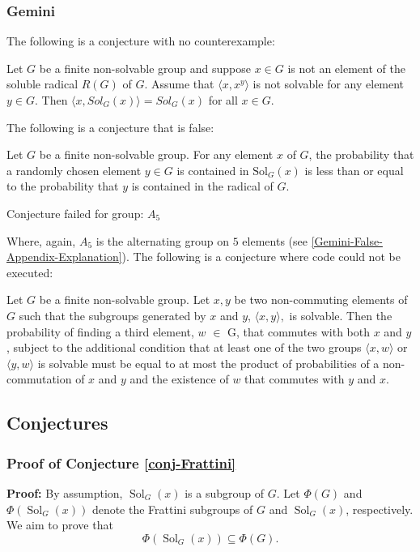\documentclass{article}
\begin{document}
\subsubsection{Gemini}
 The following is a conjecture with no counterexample:
\begin{conj}\label{Gemini-no-counter}
    Let $G$ be a finite non-solvable group and suppose $x \in G$ is not an element of the soluble radical  $R(G)$ of $G$.   Assume that $\langle x , x^y \rangle$  is not solvable for any element $ y \in G.$ Then $\langle x, Sol_G(x)\rangle=Sol_G(x)$ for all $x \in G$.
\end{conj}
The following is a conjecture that is false:
\begin{conj}\label{Gemini-False-Appendix}
    Let $G$ be a finite non-solvable group. For any element $x$ of $G$, the probability that a randomly chosen element $y \in G$ is contained in $\text{Sol}_G(x)$ is less than or equal to the  probability that $y$ is contained in the radical of $G$.
\end{conj}
\begin{codeout}
    Conjecture failed for group: $A_5$
\end{codeout}
Where, again, $A_5$ is the alternating group on $5$ elements (see \ref{Gemini-False-Appendix-Explanation}). 
The following is a conjecture where code could not be executed:
\begin{conj}
    Let $G$ be a finite non-solvable group.  Let $x, y$ be two non-commuting elements of $G$ such that the subgroups generated by $x$ and $y$, $\langle x,y \rangle,$ is solvable. Then the probability of  finding a third element, $w$ $\in$ G, that commutes with both $x$ and $y$, subject to the additional condition that at least one of the two groups  $\langle x , w\rangle$ or $\langle y ,w \rangle$ is solvable must be equal to at most the product of probabilities of a non-commutation of $x$ and $y$ and the existence of $w$ that commutes with $y$ and $x$.
\end{conj}
\subsection{Conjectures}

\subsubsection{Proof of Conjecture \ref{conj-Frattini}}\label{proof-Frattini}
\textbf{Proof:}
By assumption, \( \operatorname{Sol}_G(x) \) is a subgroup of \( G \). Let \( \Phi(G) \) and \( \Phi(\operatorname{Sol}_G(x)) \) denote the Frattini subgroups of \( G \) and \( \operatorname{Sol}_G(x) \), respectively. We aim to prove that
\[
\Phi(\operatorname{Sol}_G(x)) \subseteq \Phi(G).
\]
\end{document}
